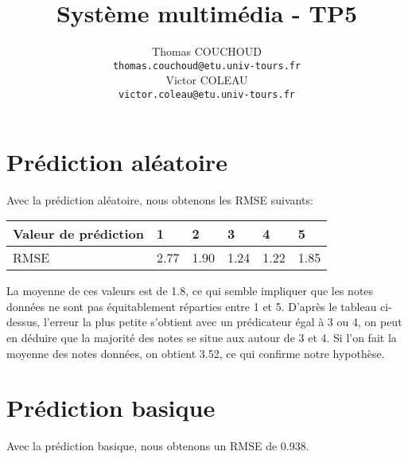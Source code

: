 \documentclass{report}
\title{Système multimédia - TP5}
\author{Thomas COUCHOUD\\\texttt{thomas.couchoud@etu.univ-tours.fr}\\Victor COLEAU\\\texttt{victor.coleau@etu.univ-tours.fr}}
\begin{document}
	\mccTitle

	\section{Prédiction aléatoire}
		Avec la prédiction aléatoire, nous obtenons les RMSE suivants:
		
		\begin{tabularx}{\textwidth}{|X|X|X|X|X|X|}
			\hline
			Valeur de prédiction & 1 & 2 & 3 & 4 & 5\\\hline
			RMSE & 2.77 & 1.90 & 1.24 & 1.22 & 1.85\\\hline
		\end{tabularx}
		
		La moyenne de ces valeurs est de 1.8, ce qui semble impliquer que les notes données ne sont pas équitablement réparties entre 1 et 5.
		D'après le tableau ci-dessus, l'erreur la plus petite s'obtient avec un prédicateur égal à 3 ou 4, on peut en déduire que la majorité des notes se situe aux autour de 3 et 4.
		Si l'on fait la moyenne des notes données, on obtient 3.52, ce qui confirme notre hypothèse.
		
	\section{Prédiction basique}
		Avec la prédiction basique, nous obtenons un RMSE de 0.938.
	
\end{document}
